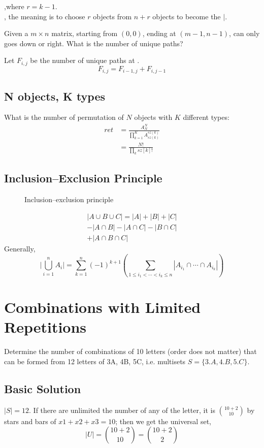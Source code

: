 ,where $r=k-1$. 
\\
, the meaning is to choose $r$ objects from $n+r$ objects to become the $|$.

 Given a $m \times n$ matrix, starting from $(0, 0)$, ending at $(m-1, n-1)$, can only goes down or right. What is the number of unique paths?

Let $F_{i, j}$ be the number of unique paths at \pyinline{[i][j]}. 
$$
F_{i, j} = F_{i-1, j} + F_{i, j-1}
$$

\subsection{N objects, K types} \label{N_objects_K_types}
What is the number of permutation of $N$ objects with $K$ different types:
\begin{align*}
ret &= \frac{A_N^N}{\prod_{k=1}^K{A_{sz(k)}^{sz(k)}}} \\
&= \frac{N!}{\prod_{k} sz[k]!}
\end{align*}

\subsection{Inclusion–Exclusion Principle}
\begin{figure}[hbtp]
\centering
{}
\caption{Inclusion–exclusion principle}
\label{fig:500px-Inclusion-exclusion}
\end{figure}
\begin{eqnarray*}
|A \cup B \cup C| = |A| + |B| + |C| \\ - |A \cap B| - |A \cap C| - |B \cap C| \\ + |A \cap B \cap C|
\end{eqnarray*}
Generally,
$$
\Biggl|\bigcup_{i=1}^n A_i\Biggr| = \sum_{k = 1}^{n} (-1)^{k+1} \left( \sum_{1 \leq i_{1} < \cdots < i_{k} \leq n} \left| A_{i_{1}} \cap \cdots \cap A_{i_{k}} \right| \right)
$$
\section{Combinations with Limited Repetitions}
Determine the number of combinations of 10 letters (order does not matter) that can be formed from 12 letters of 3A, 4B, 5C, i.e. multisets $S=\{3.A, 4.B, 5.C\}$. 

\subsection{Basic Solution}
$|S| = 12$. If there are unlimited the number of any of the letter, it is ${10+2 \choose 10}$ by stars and bars of $x1+x2+x3=10$; then we get the universal set, 
$$
|U|={10+2 \choose 10}={10+2 \choose 2}
$$

